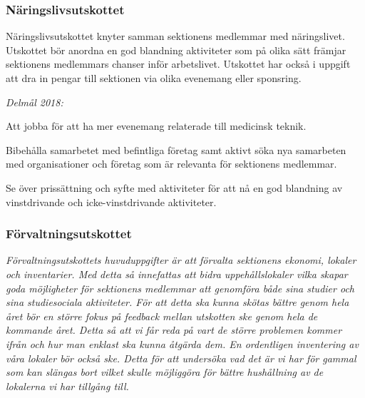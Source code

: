 \documentclass[../_main/handlingar.tex]{subfiles}
\begin{document}
\subsubsection*{Näringslivsutskottet}
Näringslivsutskottet knyter samman sektionens medlemmar med näringslivet. Utskottet bör anordna en god blandning aktiviteter som på olika sätt främjar sektionens medlemmars chanser inför arbetslivet. Utskottet har också i uppgift att dra in pengar till sektionen via olika evenemang eller sponsring.

\emph{Delmål 2018:}
\begin{dashlist}
	\item Att jobba för att ha mer evenemang relaterade till medicinsk teknik.
	\item Bibehålla samarbetet med befintliga företag samt aktivt söka nya samarbeten med organisationer och företag som är relevanta för sektionens medlemmar.
	\item Se över prissättning och syfte med aktiviteter för att nå en god blandning av vinstdrivande och icke-vinstdrivande aktiviteter.
\end{dashlist}

\newpage

\subsubsection*{Förvaltningsutskottet}

\textit{Förvaltningsutskottets huvuduppgifter är att förvalta sektionens ekonomi, lokaler och inventarier. Med detta så innefattas att bidra uppehållslokaler vilka skapar goda möjligheter för sektionens medlemmar att genomföra både sina studier och sina studiesociala aktiviteter. 
För att detta ska kunna skötas bättre genom hela året bör en större fokus på feedback mellan utskotten ske genom hela de kommande året. Detta så att vi får reda på vart de större problemen kommer ifrån och hur man enklast ska kunna åtgärda dem. 
En ordentligen inventering av våra lokaler bör också ske. Detta för att undersöka vad det är vi har för gammal som kan slängas bort vilket skulle möjliggöra för bättre hushållning av de lokalerna vi har tillgång till.
}
\end{document}
